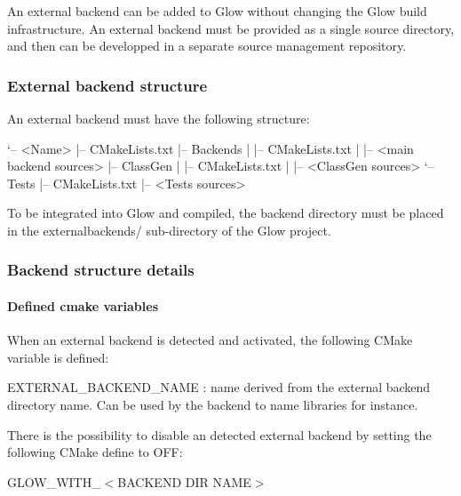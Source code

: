 An external backend can be added to Glow without changing the Glow build infrastructure. An external backend must be provided as a single source directory, and then can be developped in a separate source management repository.

\subsubsection*{External backend structure}

An external backend must have the following structure\+: 
\begin{DoxyCode}
`-- <Name>
    |-- CMakeLists.txt
    |-- Backends
    |   |-- CMakeLists.txt
    |   |-- <main backend sources>
    |-- ClassGen
    |   |-- CMakeLists.txt
    |   |-- <ClassGen sources>
    `-- Tests
        |-- CMakeLists.txt
        |-- <Tests sources>
\end{DoxyCode}


To be integrated into Glow and compiled, the backend directory must be placed in the {\ttfamily externalbackends/} sub-\/directory of the Glow project.

\subsubsection*{Backend structure details}

\paragraph*{Defined cmake variables}

When an external backend is detected and activated, the following C\+Make variable is defined\+:


\begin{DoxyItemize}
\item {\ttfamily E\+X\+T\+E\+R\+N\+A\+L\+\_\+\+B\+A\+C\+K\+E\+N\+D\+\_\+\+N\+A\+ME} \+: name derived from the external backend directory name. Can be used by the backend to name libraries for instance.
\end{DoxyItemize}

There is the possibility to disable an detected external backend by setting the following C\+Make define to {\ttfamily O\+FF}\+:


\begin{DoxyItemize}
\item {\ttfamily G\+L\+O\+W\+\_\+\+W\+I\+T\+H\+\_\+$<$B\+A\+C\+K\+E\+ND D\+IR N\+A\+ME$>$}
\end{DoxyItemize}

